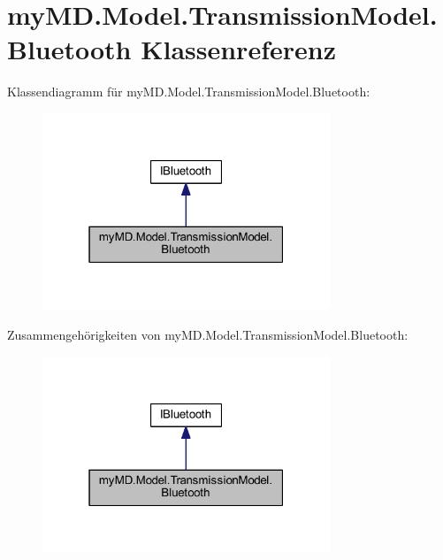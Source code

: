 \hypertarget{classmy_m_d_1_1_model_1_1_transmission_model_1_1_bluetooth}{}\section{my\+M\+D.\+Model.\+Transmission\+Model.\+Bluetooth Klassenreferenz}
\label{classmy_m_d_1_1_model_1_1_transmission_model_1_1_bluetooth}


Klassendiagramm für my\+M\+D.\+Model.\+Transmission\+Model.\+Bluetooth\+:\nopagebreak
\begin{figure}[H]
\begin{center}
\leavevmode
\includegraphics[width=244pt]{classmy_m_d_1_1_model_1_1_transmission_model_1_1_bluetooth__inherit__graph}
\end{center}
\end{figure}


Zusammengehörigkeiten von my\+M\+D.\+Model.\+Transmission\+Model.\+Bluetooth\+:\nopagebreak
\begin{figure}[H]
\begin{center}
\leavevmode
\includegraphics[width=244pt]{classmy_m_d_1_1_model_1_1_transmission_model_1_1_bluetooth__coll__graph}
\end{center}
\end{figure}
